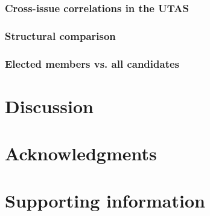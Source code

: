 \documentclass[10pt,letterpaper]{article}
\begin{document}
\subsubsection*{Cross-issue correlations in the UTAS}
\label{sec:taniguchi_overview}

\subsubsection*{Structural comparison}
\label{sec:structure_comparison}

\subsubsection*{Elected members vs. all candidates}
\label{sec:elected_vs_candidates}


\section*{Discussion}


\section*{Acknowledgments}


\nolinenumbers




\section*{Supporting information}
\end{document}
